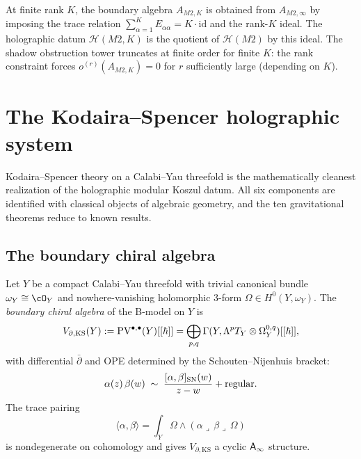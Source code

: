 \begin{remark}
At finite rank $K$, the boundary algebra $A_{M2,K}$ is obtained from
$A_{M2,\infty}$ by imposing the trace relation
$\sum_{\alpha=1}^K E_{\alpha\alpha} = K \cdot \mathrm{id}$ and the
rank-$K$ ideal. The holographic datum $\mathcal{H}(M2,K)$ is the
quotient of $\mathcal{H}(M2)$ by this ideal. The shadow obstruction tower
truncates at finite order for finite $K$: the rank constraint forces
$o^{(r)}(A_{M2,K}) = 0$ for $r$ sufficiently large (depending on $K$).
\end{remark}


%
%

\section{The Kodaira--Spencer holographic system}

Kodaira--Spencer theory on a Calabi--Yau threefold is the mathematically
cleanest realization of the holographic modular Koszul datum. All six
components are identified with classical objects of algebraic geometry,
and the ten gravitational theorems reduce to known results.

\subsection{The boundary chiral algebra}

\begin{definition}
\label{def:thqg-ks-boundary}
Let $Y$ be a compact Calabi--Yau threefold with trivial canonical
bundle $\omega_Y \cong \cO_Y$ and nowhere-vanishing holomorphic
$3$-form $\Omega \in H^0(Y, \omega_Y)$.
The \emph{boundary chiral algebra} of the B-model on $Y$ is
\begin{equation}%
V_{\partial, \mathrm{KS}}(Y)
:= \PV^{\bullet,\bullet}(Y)[[\hbar]]
= \bigoplus_{p,q} \Gamma(Y, \Lambda^p T_Y \otimes \Omega^{0,q}_Y)[[\hbar]],
\end{equation}
with differential $\bar\partial$ and OPE determined by the
Schouten--Nijenhuis bracket:
\begin{equation}%
\alpha(z)\, \beta(w) \;\sim\;
\frac{[\alpha, \beta]_{\sn}(w)}{z - w} + \text{regular}.
\end{equation}
The trace pairing
\begin{equation}%
\langle \alpha, \beta \rangle
= \int_Y \Omega \wedge (\alpha \lrcorner\, \beta \lrcorner\, \Omega)
\end{equation}
is nondegenerate on cohomology and gives $V_{\partial,\mathrm{KS}}$
a cyclic $\mathsf{A}_{\infty}$ structure.
\end{definition}

